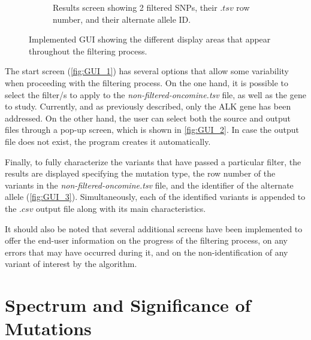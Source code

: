 \begin{figure}[ht]
\begin{subfigure}{0.52\textwidth}
        \caption{Results screen showing 2 filtered SNPs, their $.tsv$ row number, and their alternate allele ID.}
        \label{fig:GUI_3}
    \end{subfigure}
    \hfill
    \caption{Implemented GUI showing the different display areas that appear throughout the filtering process.}
    \label{fig:GUI}
\end{figure}

The start screen (\autoref{fig:GUI_1}) has several options that allow some variability when proceeding with the filtering process. On the one hand, it is possible to select the filter\slash s to apply to the \textit{non-filtered-oncomine.tsv} file, as well as the gene to study. Currently, and as previously described, only the ALK gene has been addressed. On the other hand, the user can select both the source and output files through a pop-up screen, which is shown in \autoref{fig:GUI_2}. In case the output file does not exist, the program creates it automatically.

Finally, to fully characterize the variants that have passed a particular filter, the results are displayed specifying the mutation type, the row number of the variants in the \textit{non-filtered-oncomine.tsv} file, and the identifier of the alternate allele (\autoref{fig:GUI_3}). Simultaneously, each of the identified variants is appended to the $.csv$ output file along with its main characteristics.

It should also be noted that several additional screens have been implemented to offer the end-user information on the progress of the filtering process, on any errors that may have occurred during it, and on the non-identification of any variant of interest by the algorithm.

\section{Spectrum and Significance of Mutations}





